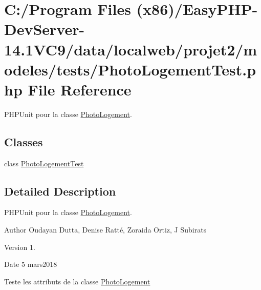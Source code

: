 \hypertarget{_photo_logement_test_8php}{}\section{C\+:/\+Program Files (x86)/\+Easy\+P\+H\+P-\/\+Dev\+Server-\/14.1\+V\+C9/data/localweb/projet2/modeles/tests/\+Photo\+Logement\+Test.php File Reference}
\label{_photo_logement_test_8php}


P\+H\+P\+Unit pour la classe \hyperlink{class_photo_logement}{Photo\+Logement}.  


\subsection*{Classes}
\begin{DoxyCompactItemize}
\item 
class \hyperlink{class_photo_logement_test}{Photo\+Logement\+Test}
\end{DoxyCompactItemize}


\subsection{Detailed Description}
P\+H\+P\+Unit pour la classe \hyperlink{class_photo_logement}{Photo\+Logement}. 

\begin{DoxyAuthor}{Author}
Oudayan Dutta, Denise Ratté, Zoraida Ortiz, J Subirats 
\end{DoxyAuthor}
\begin{DoxyVersion}{Version}
1. 
\end{DoxyVersion}
\begin{DoxyDate}{Date}
5 mars2018
\end{DoxyDate}
Teste les attributs de la classe \hyperlink{class_photo_logement}{Photo\+Logement} 